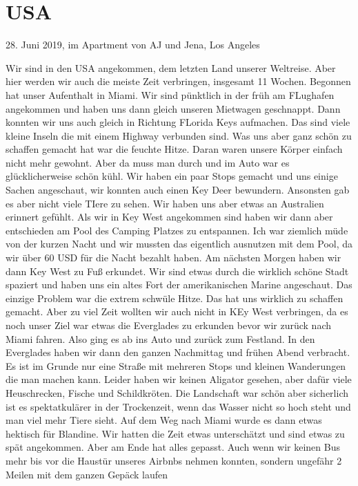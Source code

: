 \documentclass[11pt]{book}
\begin{document}
\chapter{USA}

28. Juni 2019, im Apartment von AJ und Jena, Los Angeles 

Wir sind in den USA angekommen, dem letzten Land unserer Weltreise. Aber hier werden wir auch die meiste Zeit verbringen, insgesamt 11 Wochen. Begonnen 
hat unser Aufenthalt in Miami. Wir sind pünktlich in der früh am FLughafen angekommen und haben uns dann gleich unseren Mietwagen geschnappt. Dann konnten 
wir uns auch gleich in Richtung FLorida Keys aufmachen. Das sind viele kleine Inseln die mit einem Highway verbunden sind. Was uns aber ganz schön zu schaffen 
gemacht hat war die feuchte Hitze. Daran waren unsere Körper einfach nicht mehr gewohnt. Aber da muss man durch und im Auto war es glücklicherweise schön 
kühl. Wir haben ein paar Stops gemacht und uns einige Sachen angeschaut, wir konnten auch einen Key Deer bewundern. Ansonsten gab es aber nicht viele 
TIere zu sehen. Wir haben uns aber etwas an Australien erinnert gefühlt. Als wir in Key West angekommen sind haben wir dann aber entschieden am Pool des 
Camping Platzes zu entspannen. Ich war ziemlich müde von der kurzen Nacht und wir mussten das eigentlich ausnutzen mit dem Pool, da wir über 60 USD für die 
Nacht bezahlt haben. 
Am nächsten Morgen haben wir dann Key West zu Fuß erkundet. Wir sind etwas durch die wirklich schöne Stadt spaziert und haben uns ein altes Fort der 
amerikanischen Marine angeschaut. Das einzige Problem war die extrem schwüle Hitze. Das hat uns wirklich zu schaffen gemacht. Aber zu viel Zeit wollten wir 
auch nicht in KEy West verbringen, da es noch unser Ziel war etwas die Everglades zu erkunden bevor wir zurück nach Miami fahren. Also ging es ab ins 
Auto und zurück zum Festland. In den Everglades haben wir dann den ganzen Nachmittag und frühen Abend verbracht. Es ist im Grunde nur eine Straße mit mehreren 
Stops und kleinen Wanderungen die man machen kann. Leider haben wir keinen Aligator gesehen, aber dafür viele Heuschrecken, Fische und Schildkröten. Die 
Landschaft war schön aber sicherlich ist es spektatkulärer in der Trockenzeit, wenn das Wasser nicht so hoch steht und man viel mehr Tiere sieht. Auf dem 
Weg nach Miami wurde es dann etwas hektisch für Blandine. Wir hatten die Zeit etwas unterschätzt und sind etwas zu spät angekommen. Aber am Ende hat 
alles gepasst. Auch wenn wir keinen Bus mehr bis vor die Haustür unseres Airbnbs nehmen konnten, sondern ungefähr 2 Meilen mit dem ganzen Gepäck laufen 
\end{document}
